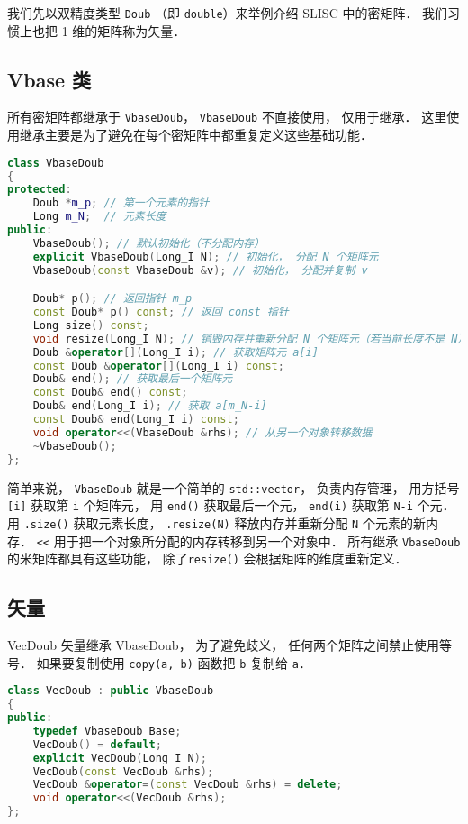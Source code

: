 
\begin{issues}
\issueDraft
\end{issues}


我们先以双精度类型 \verb|Doub| （即 \verb|double|）来举例介绍 SLISC 中的密矩阵． 我们习惯上也把 1 维的矩阵称为矢量．

\subsection{Vbase 类}
所有密矩阵都继承于 \verb|VbaseDoub|， \verb|VbaseDoub| 不直接使用， 仅用于继承． 这里使用继承主要是为了避免在每个密矩阵中都重复定义这些基础功能．
\begin{lstlisting}[language=cpp]
class VbaseDoub
{
protected:
    Doub *m_p; // 第一个元素的指针
    Long m_N;  // 元素长度
public:
    VbaseDoub(); // 默认初始化（不分配内存）
    explicit VbaseDoub(Long_I N); // 初始化， 分配 N 个矩阵元
    VbaseDoub(const VbaseDoub &v); // 初始化， 分配并复制 v

    Doub* p(); // 返回指针 m_p
    const Doub* p() const; // 返回 const 指针
    Long size() const;
    void resize(Long_I N); // 销毁内存并重新分配 N 个矩阵元（若当前长度不是 N）
    Doub &operator[](Long_I i); // 获取矩阵元 a[i]
    const Doub &operator[](Long_I i) const; 
    Doub& end(); // 获取最后一个矩阵元
    const Doub& end() const;
    Doub& end(Long_I i); // 获取 a[m_N-i]
    const Doub& end(Long_I i) const;
    void operator<<(VbaseDoub &rhs); // 从另一个对象转移数据
    ~VbaseDoub();
};
\end{lstlisting}

简单来说， \verb|VbaseDoub| 就是一个简单的 \verb|std::vector|， 负责内存管理， 用方括号 \verb|[i]| 获取第 \verb|i| 个矩阵元， 用 \verb|end()| 获取最后一个元， \verb|end(i)| 获取第 \verb|N-i| 个元． 用 \verb|.size()| 获取元素长度， \verb|.resize(N)| 释放内存并重新分配 \verb|N| 个元素的新内存． \verb|<<| 用于把一个对象所分配的内存转移到另一个对象中． 所有继承 \verb|VbaseDoub| 的米矩阵都具有这些功能， 除了\verb|resize()| 会根据矩阵的维度重新定义．

\subsection{矢量}
VecDoub 矢量继承 VbaseDoub， 为了避免歧义， 任何两个矩阵之间禁止使用等号． 如果要复制使用 \verb|copy(a, b)| 函数把 \verb|b| 复制给 \verb|a|．
\begin{lstlisting}[language=cpp]
class VecDoub : public VbaseDoub
{
public:
    typedef VbaseDoub Base;
    VecDoub() = default;
    explicit VecDoub(Long_I N);
    VecDoub(const VecDoub &rhs);
    VecDoub &operator=(const VecDoub &rhs) = delete;
    void operator<<(VecDoub &rhs);
};
\end{lstlisting}

